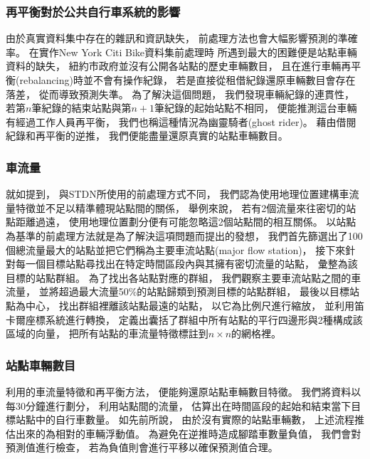 \documentclass[a4paper,14pt]{extarticle}
\begin{document}
            \subsubsection{再平衡對於公共自行車系統的影響}
                \label{subsubsec:rebal}
                由於真實資料集中存在的雜訊和資訊缺失，
                前處理方法也會大幅影響預測的準確率。
                在實作New York Citi Bike資料集前處理時
                所遇到最大的困難便是站點車輛資料的缺失，
                紐約市政府並沒有公開各站點的歷史車輛數目，
                且在進行車輛再平衡(rebalancing)時並不會有操作紀錄，
                若是直接從租借紀錄還原車輛數目會存在落差，
                從而導致預測失準。
                為了解決這個問題，
                我們發現車輛紀錄的連貫性，
                若第$n$筆紀錄的結束站點與第$n + 1$筆紀錄的起始站點不相同，
                便能推測這台車輛有經過工作人員再平衡，
                我們也稱這種情況為幽靈騎者(ghost rider)。
                藉由借閱紀錄和再平衡的逆推，
                我們便能盡量還原真實的站點車輛數目。

            \subsubsection{車流量}
                \label{subsubsec:flow}
                就如提到，
                與STDN所使用的前處理方式不同，
                我們認為使用地理位置建構車流量特徵並不足以精準體現站點間的關係，
                舉例來說，
                若有2個流量來往密切的站點距離過遠，
                使用地理位置劃分便有可能忽略這2個站點間的相互關係。
                以站點為基準的前處理方法就是為了解決這項問題而提出的發想，
                我們首先篩選出了100個總流量最大的站點並把它們稱為主要車流站點(major flow station)，
                接下來針對每一個目標站點尋找出在特定時間區段內與其擁有密切流量的站點，
                彙整為該目標的站點群組。
                為了找出各站點對應的群組，
                我們觀察主要車流站點之間的車流量，
                並將超過最大流量50\%的站點歸類到預測目標的站點群組，
                最後以目標站點為中心，
                找出群組裡離該站點最遠的站點，
                以它為比例尺進行縮放，
                並利用笛卡爾座標系統進行轉換，
                定義出囊括了群組中所有站點的平行四邊形與2種構成該區域的向量，
                把所有站點的車流量特徵標註到$n \times n$的網格裡。

            \subsubsection{站點車輛數目}
                利用的車流量特徵和再平衡方法，
                便能夠還原站點車輛數目特徵。
                我們將資料以每30分鐘進行劃分，
                利用站點間的流量，
                估算出在時間區段的起始和結束當下目標站點中的自行車數量。
                如先前所說，
                由於沒有實際的站點車輛數，
                上述流程推估出來的為相對的車輛浮動值。
                為避免在逆推時造成腳踏車數量負值，
                我們會對預測值進行檢查，
                若為負值則會進行平移以確保預測值合理。
\end{document}

